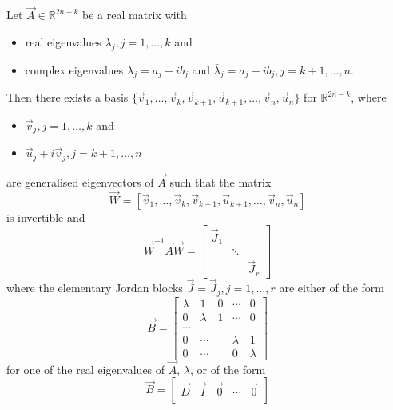 \begin{theorem}
	\label{thm:la:jordan}
	Let $\vec A \in \mathbb R^{2n - k}$ be a real matrix with
	\begin{itemize}
		\item real eigenvalues $\lambda_j, j = 1, \dotsc, k$ and
		\item complex eigenvalues $\lambda_j = a_j + ib_j$ and $\bar \lambda_j = a_j - ib_j, j = k + 1, \dotsc, n$.
	\end{itemize}
	Then there exists a basis $\{\vec v_1, \dotsc, \vec v_k, \vec v_{k + 1}, \vec u_{k + 1}, \dotsc, \vec v_n, \vec u_n\}$ for $\mathbb R^{2n - k}$, where
	\begin{itemize}
		\item $\vec v_j, j = 1, \dotsc, k$ and
		\item $\vec u_j + i\vec v_j, j = k + 1, \dotsc, n$
	\end{itemize}
	are generalised eigenvectors of $\vec A$ such that the matrix
	\begin{equation*}
		\vec W = [\vec v_1, \dotsc, \vec v_k, \vec v_{k + 1}, \vec u_{k + 1}, \dotsc, \vec v_n, \vec u_n]
	\end{equation*}
	is invertible and
	\begin{equation}
		\vec W^{-1} \vec A \vec W =
		\begin{bmatrix}
			\vec J_1 	& 			& \\
						& \ddots 	& \\
						&			& \vec J_r
		\end{bmatrix}
	\end{equation}
	where the elementary Jordan blocks $\vec J = \vec J_j, j = 1, \dotsc, r$ are either of the form
	\begin{equation}
		\vec B =
		\begin{bmatrix}
			\lambda & 1 		& 0 & \cdots 	& 0 \\
			0 		& \lambda 	& 1 & \cdots 	& 0 \\
			\cdots 	&			&	&		 	& \\
			0 		& \cdots 	& 	& \lambda 	& 1 \\
			0 		& \cdots	&	& 0 		& \lambda
		\end{bmatrix}
	\end{equation}
	for one of the real eigenvalues of $\vec A$, $\lambda$, or of the form
	\begin{equation}
		\vec B =
		\begin{bmatrix}
			\vec D 	& \vec I	& \vec 0 	& \cdots 	& \vec 0 \\

\end{bmatrix}
\end{equation}
\end{theorem}
